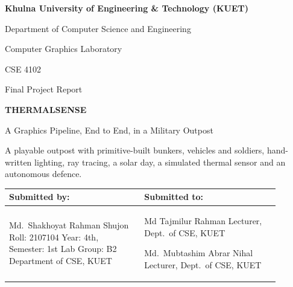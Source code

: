\begin{titlepage}
\centering
\vspace*{2mm}
{\bfseries\large Khulna University of Engineering \& Technology (KUET)\par}
\vspace{1.2mm}
{\normalsize Department of Computer Science and Engineering\par}
\vspace{9mm}
{\large Computer Graphics Laboratory\par}
\vspace{1mm}
{\normalsize CSE 4102\par}
\vspace{8mm}
{\normalsize Final Project Report\par}
\vspace{9mm}
{\bfseries\fontsize{30}{34}\selectfont\color{covertitle} THERMALSENSE\par}
\vspace{4mm}
{\Large A Graphics Pipeline, End to End, in a Military Outpost\par}
\vspace{8mm}
\par\vspace{5mm}
\parbox{0.86\linewidth}{\centering\normalsize A playable outpost with primitive-built bunkers, vehicles and soldiers, hand-written
lighting, ray tracing, a solar day, a simulated thermal sensor and an autonomous defence.}
\par\vfill
{\renewcommand{\arraystretch}{1.25}\small
\begin{tabular}{|>{\raggedright\arraybackslash}p{0.445\linewidth}|>{\raggedright\arraybackslash}p{0.445\linewidth}|}
\hline
\textbf{\color{covertitle}Submitted by:} & \textbf{\color{covertitle}Submitted to:}\\
\hline
Md.\ Shakhoyat Rahman Shujon\newline
Roll: 2107104\newline
Year: 4th, Semester: 1st\newline
Lab Group: B2\newline
Department of CSE, KUET
&
Md Tajmilur Rahman\newline
Lecturer, Dept.\ of CSE, KUET\par\vspace{1.5mm}
Md.\ Mubtashim Abrar Nihal\newline
Lecturer, Dept.\ of CSE, KUET\\
\hline
\end{tabular}}
\vspace*{4mm}
\end{titlepage}

\tableofcontents
\clearpage
{}
